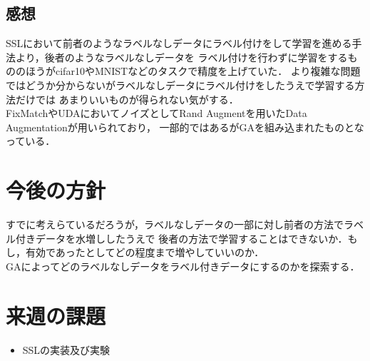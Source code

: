 \documentclass[twocolumn]{jarticle}     %
\begin{document}
\subsection{感想}
SSLにおいて前者のようなラベルなしデータにラベル付けをして学習を進める手法より，後者のようなラベルなしデータを
ラベル付けを行わずに学習をするもののほうがcifar10やMNISTなどのタスクで精度を上げていた．
より複雑な問題ではどうか分からないがラベルなしデータにラベル付けをしたうえで学習する方法だけでは
あまりいいものが得られない気がする．\\
FixMatchやUDAにおいてノイズとしてRand Augmentを用いたData Augmentationが用いられており，
一部的ではあるがGAを組み込まれたものとなっている．


\section{今後の方針}
すでに考えらているだろうが，ラベルなしデータの一部に対し前者の方法でラベル付きデータを水増ししたうえで
後者の方法で学習することはできないか．もし，有効であったとしてどの程度まで増やしていいのか．\\
GAによってどのラベルなしデータをラベル付きデータにするのかを探索する．


\section{来週の課題}
\begin{itemize}
	\item SSLの実装及び実験
\end{itemize}
\end{document}
